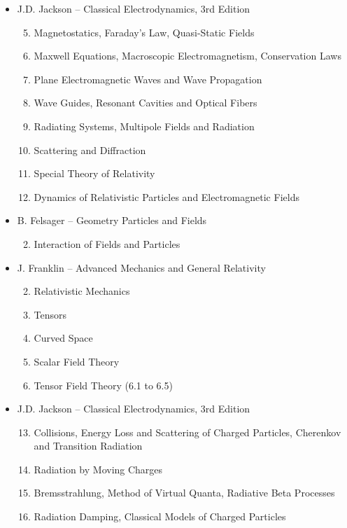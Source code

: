 \begin{itemize}
\item J.D. Jackson -- Classical Electrodynamics, 3rd Edition
\begin{enumerate}
\setcounter{enumi}{4}
\item Magnetostatics, Faraday's Law, Quasi-Static Fields
\item Maxwell Equations, Macroscopic Electromagnetism, Conservation Laws
\item Plane Electromagnetic Waves and Wave Propagation
\item Wave Guides, Resonant Cavities and Optical Fibers
\item Radiating Systems, Multipole Fields and Radiation
\item Scattering and Diffraction
\item Special Theory of Relativity
\item Dynamics of Relativistic Particles and Electromagnetic Fields
\end{enumerate}

\item B. Felsager -- Geometry Particles and Fields
\begin{enumerate}
\setcounter{enumi}{1}
\item Interaction of Fields and Particles
\end{enumerate}

\item J. Franklin -- Advanced Mechanics and General Relativity
\begin{enumerate}
\setcounter{enumi}{1}
\item Relativistic Mechanics
\item Tensors
\item Curved Space
\item Scalar Field Theory
\item Tensor Field Theory (6.1 to 6.5)
\end{enumerate}

\item J.D. Jackson -- Classical Electrodynamics, 3rd Edition
\begin{enumerate}
\setcounter{enumi}{12}
\item Collisions, Energy Loss and Scattering of Charged Particles, Cherenkov and Transition Radiation
\item Radiation by Moving Charges
\item Bremsstrahlung, Method of Virtual Quanta, Radiative Beta Processes
\item Radiation Damping, Classical Models of Charged Particles
\end{enumerate}


\end{itemize}
